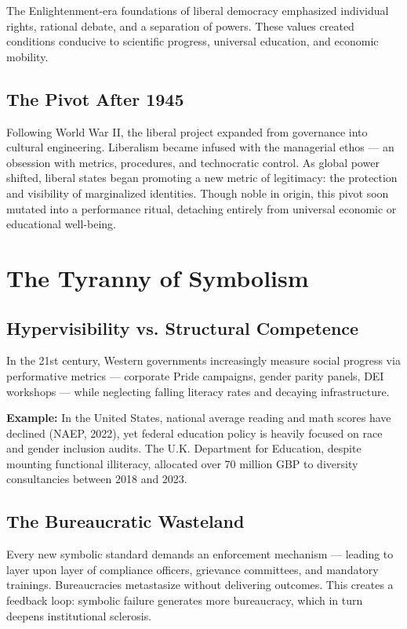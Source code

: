 \documentclass[11pt]{article}
\begin{document}
The Enlightenment-era foundations of liberal democracy emphasized individual rights, rational debate, and a separation of powers. These values created conditions conducive to scientific progress, universal education, and economic mobility.

\subsection{The Pivot After 1945}

Following World War II, the liberal project expanded from governance into cultural engineering. Liberalism became infused with the managerial ethos — an obsession with metrics, procedures, and technocratic control. As global power shifted, liberal states began promoting a new metric of legitimacy: the protection and visibility of marginalized identities. Though noble in origin, this pivot soon mutated into a performance ritual, detaching entirely from universal economic or educational well-being.

\section{The Tyranny of Symbolism}

\subsection{Hypervisibility vs. Structural Competence}

In the 21st century, Western governments increasingly measure social progress via performative metrics — corporate Pride campaigns, gender parity panels, DEI workshops — while neglecting falling literacy rates and decaying infrastructure.

\textbf{Example:} In the United States, national average reading and math scores have declined (NAEP, 2022), yet federal education policy is heavily focused on race and gender inclusion audits. The U.K. Department for Education, despite mounting functional illiteracy, allocated over 70 million GBP to diversity consultancies between 2018 and 2023.

\subsection{The Bureaucratic Wasteland}

Every new symbolic standard demands an enforcement mechanism — leading to layer upon layer of compliance officers, grievance committees, and mandatory trainings. Bureaucracies metastasize without delivering outcomes. This creates a feedback loop: symbolic failure generates more bureaucracy, which in turn deepens institutional sclerosis.
\end{document}
